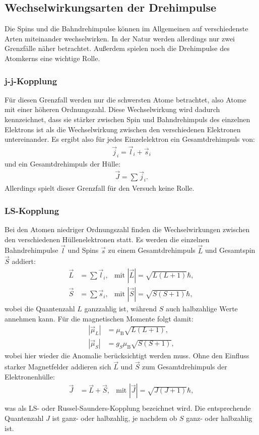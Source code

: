 \subsection{Wechselwirkungsarten der Drehimpulse}
\label{sec:Wechselwirkungen}
Die Spins und die Bahndrehimpulse können im Allgemeinen auf verschiedenste Arten miteinander wechselwirken. In der Natur werden allerdings nur zwei Grenzfälle näher betrachtet. Außerdem spielen noch die Drehimpulse des Atomkerns eine wichtige Rolle.

\subsubsection{j-j-Kopplung}
Für diesen Grenzfall werden nur die schwersten Atome betrachtet, also Atome mit einer höheren Ordnungszahl. Diese Wechselwirkung wird dadurch kennzeichnet, dass sie stärker zwischen Spin und Bahndrehimpuls des einzelnen Elektrons ist als die Wechselwirkung zwischen den verschiedenen Elektronen untereinander. Es ergibt also für jedes Einzelelektron ein Gesamtdrehimpuls von:
\begin{align}
\vec{j}_i=\vec{l}_i+\vec{s}_i
\end{align}
und ein Gesamtdrehimpuls der Hülle:
\begin{align}
\vec{J}=\sum\vec{j}_i.
\end{align}
Allerdings spielt dieser Grenzfall für den Versuch keine Rolle.

\subsubsection{LS-Kopplung}
Bei den Atomen niedriger Ordnungszahl finden die Wechselwirkungen zwischen den verschiedenen Hüllenelektronen statt. Es werden die einzelnen Bahndrehimpulse $\vec{l}$ und Spins $\vec{s}$ zu einem Gesamtdrehimpuls $\vec{L}$ und Gesamtspin $\vec{S}$ addiert:
\begin{align}
\vec{L}&=\sum\vec{l}_i, & \text{mit }|\vec{L}|=\sqrt{L(L+1)}\hbar,\\
\vec{S}&=\sum\vec{s}_i, & \text{mit }|\vec{S}|=\sqrt{S(S+1)}\hbar,
\end{align}
wobei die Quantenzahl $L$ ganzzahlig ist, während $S$ auch halbzahlige Werte annehmen kann. Für die magnetischen Momente folgt damit:
\begin{align}
|\vec{\mu}_L|&=\mu_\text{B}\sqrt{L(L+1)},\\
|\vec{\mu}_S|&=g_S\mu_\text{B}\sqrt{S(S+1)},
\end{align}
wobei hier wieder die Anomalie berücksichtigt werden muss.
Ohne den Einfluss starker Magnetfelder addieren sich $\vec{L}$ und $\vec{S}$ zum Gesamtdrehimpuls der Elektronenhülle:
\begin{align}
\vec{J}&=\vec{L}+\vec{S}, & \text{mit }|\vec{J}|=\sqrt{J(J+1)}\hbar, \\
\end{align}
was als LS- oder Russel-Saunders-Kopplung bezeichnet wird. Die entsprechende Quantenzahl $J$ ist ganz- oder halbzahlig, je nachdem ob $S$ ganz- oder halbzahlig ist.

